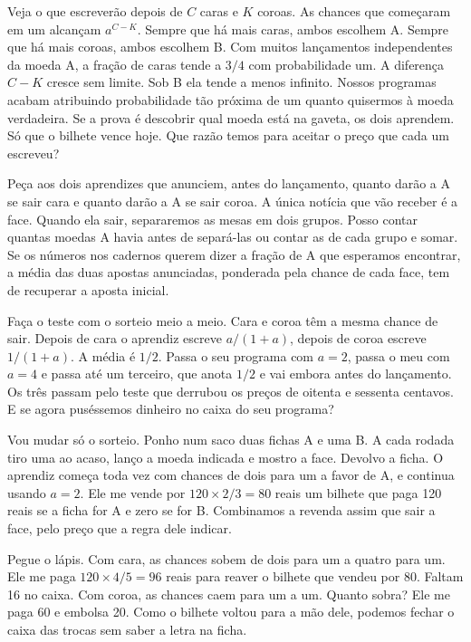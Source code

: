 Veja o que escreverão depois de \(C\) caras e \(K\) coroas. As chances que começaram em um alcançam \(a^{C-K}\). Sempre que há mais caras, ambos escolhem A. Sempre que há mais coroas, ambos escolhem B. Com muitos lançamentos independentes da moeda A, a fração de caras tende a \(3/4\) com probabilidade um. A diferença \(C-K\) cresce sem limite. Sob B ela tende a menos infinito. Nossos programas acabam atribuindo probabilidade tão próxima de um quanto quisermos à moeda verdadeira. Se a prova é descobrir qual moeda está na gaveta, os dois aprendem. Só que o bilhete vence hoje. Que razão temos para aceitar o preço que cada um escreveu?

Peça aos dois aprendizes que anunciem, antes do lançamento, quanto darão a A se sair cara e quanto darão a A se sair coroa. A única notícia que vão receber é a face. Quando ela sair, separaremos as mesas em dois grupos. Posso contar quantas moedas A havia antes de separá-las ou contar as de cada grupo e somar. Se os números nos cadernos querem dizer a fração de A que esperamos encontrar, a média das duas apostas anunciadas, ponderada pela chance de cada face, tem de recuperar a aposta inicial.

Faça o teste com o sorteio meio a meio. Cara e coroa têm a mesma chance de sair. Depois de cara o aprendiz escreve $a/(1+a)$, depois de coroa escreve $1/(1+a)$. A média é $1/2$. Passa o seu programa com $a=2$, passa o meu com $a=4$ e passa até um terceiro, que anota $1/2$ e vai embora antes do lançamento. Os três passam pelo teste que derrubou os preços de oitenta e sessenta centavos. E se agora puséssemos dinheiro no caixa do seu programa?

Vou mudar só o sorteio. Ponho num saco duas fichas A e uma B. A cada rodada tiro uma ao acaso, lanço a moeda indicada e mostro a face. Devolvo a ficha. O aprendiz começa toda vez com chances de dois para um a favor de A, e continua usando $a=2$. Ele me vende por $120\times 2/3=80$ reais um bilhete que paga 120 reais se a ficha for A e zero se for B. Combinamos a revenda assim que sair a face, pelo preço que a regra dele indicar.

Pegue o lápis. Com cara, as chances sobem de dois para um a quatro para um. Ele me paga $120\times 4/5=96$ reais para reaver o bilhete que vendeu por 80. Faltam 16 no caixa. Com coroa, as chances caem para um a um. Quanto sobra? Ele me paga 60 e embolsa 20. Como o bilhete voltou para a mão dele, podemos fechar o caixa das trocas sem saber a letra na ficha.

